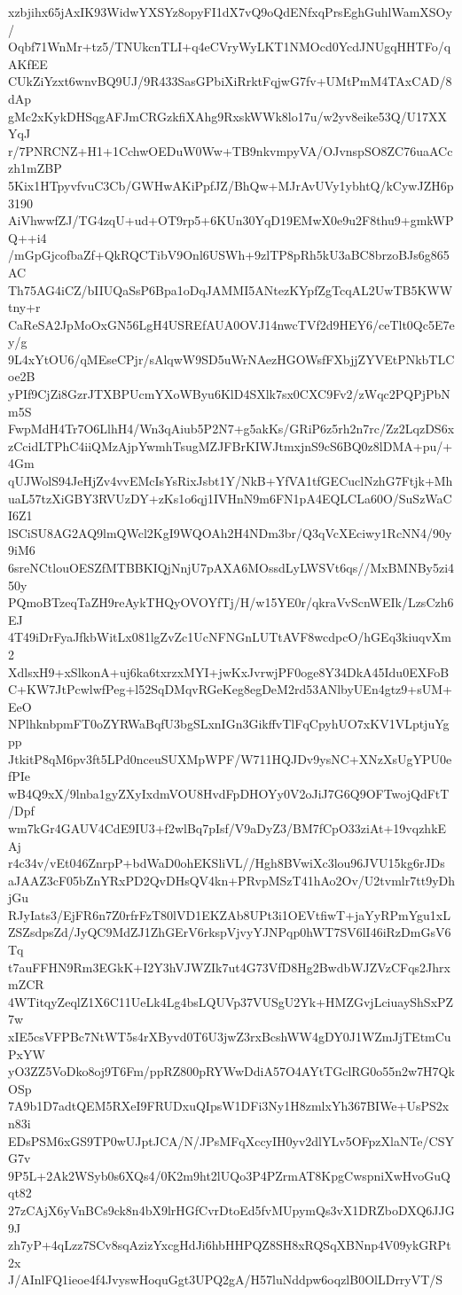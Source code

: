 xzbjihx65jAxIK93WidwYXSYz8opyFI1dX7vQ9oQdENfxqPrsEghGuhlWamXSOy/
Oqbf71WnMr+tz5/TNUkcnTLI+q4eCVryWyLKT1NMOcd0YcdJNUgqHHTFo/qAKfEE
CUkZiYzxt6wnvBQ9UJ/9R433SasGPbiXiRrktFqjwG7fv+UMtPmM4TAxCAD/8dAp
gMc2xKykDHSqgAFJmCRGzkfiXAhg9RxskWWk8lo17u/w2yv8eike53Q/U17XXYqJ
r/7PNRCNZ+H1+1CchwOEDuW0Ww+TB9nkvmpyVA/OJvnspSO8ZC76uaACczh1mZBP
5Kix1HTpyvfvuC3Cb/GWHwAKiPpfJZ/BhQw+MJrAvUVy1ybhtQ/kCywJZH6p3190
AiVhwwfZJ/TG4zqU+ud+OT9rp5+6KUn30YqD19EMwX0e9u2F8thu9+gmkWPQ++i4
/mGpGjcofbaZf+QkRQCTibV9Onl6USWh+9zlTP8pRh5kU3aBC8brzoBJs6g865AC
Th75AG4iCZ/bIIUQaSsP6Bpa1oDqJAMMI5ANtezKYpfZgTcqAL2UwTB5KWWtny+r
CaReSA2JpMoOxGN56LgH4USREfAUA0OVJ14nwcTVf2d9HEY6/ceTlt0Qc5E7ey/g
9L4xYtOU6/qMEseCPjr/sAlqwW9SD5uWrNAezHGOWsfFXbjjZYVEtPNkbTLCoe2B
yPIf9CjZi8GzrJTXBPUcmYXoWByu6KlD4SXlk7sx0CXC9Fv2/zWqc2PQPjPbNm5S
FwpMdH4Tr7O6LlhH4/Wn3qAiub5P2N7+g5akKs/GRiP6z5rh2n7rc/Zz2LqzDS6x
zCcidLTPhC4iiQMzAjpYwmhTsugMZJFBrKIWJtmxjnS9cS6BQ0z8lDMA+pu/+4Gm
qUJWolS94JeHjZv4vvEMcIsYsRixJsbt1Y/NkB+YfVA1tfGECuclNzhG7Ftjk+Mh
uaL57tzXiGBY3RVUzDY+zKs1o6qj1IVHnN9m6FN1pA4EQLCLa60O/SuSzWaCI6Z1
lSCiSU8AG2AQ9lmQWcl2KgI9WQOAh2H4NDm3br/Q3qVcXEciwy1RcNN4/90y9iM6
6sreNCtlouOESZfMTBBKIQjNnjU7pAXA6MOssdLyLWSVt6qs//MxBMNBy5zi450y
PQmoBTzeqTaZH9reAykTHQyOVOYfTj/H/w15YE0r/qkraVvScnWEIk/LzsCzh6EJ
4T49iDrFyaJfkbWitLx081lgZvZc1UcNFNGnLUTtAVF8wcdpcO/hGEq3kiuqvXm2
XdlsxH9+xSlkonA+uj6ka6txrzxMYI+jwKxJvrwjPF0oge8Y34DkA45Idu0EXFoB
C+KW7JtPcwlwfPeg+l52SqDMqvRGeKeg8egDeM2rd53ANlbyUEn4gtz9+sUM+EeO
NPlhknbpmFT0oZYRWaBqfU3bgSLxnIGn3GikffvTlFqCpyhUO7xKV1VLptjuYgpp
JtkitP8qM6pv3ft5LPd0nceuSUXMpWPF/W711HQJDv9ysNC+XNzXsUgYPU0efPIe
wB4Q9xX/9lnba1gyZXyIxdmVOU8HvdFpDHOYy0V2oJiJ7G6Q9OFTwojQdFtT/Dpf
wm7kGr4GAUV4CdE9IU3+f2wlBq7pIsf/V9aDyZ3/BM7fCpO33ziAt+19vqzhkEAj
r4c34v/vEt046ZnrpP+bdWaD0ohEKSliVL//Hgh8BVwiXc3lou96JVU15kg6rJDs
aJAAZ3cF05bZnYRxPD2QvDHsQV4kn+PRvpMSzT41hAo2Ov/U2tvmlr7tt9yDhjGu
RJyIats3/EjFR6n7Z0rfrFzT80lVD1EKZAb8UPt3i1OEVtfiwT+jaYyRPmYgu1xL
ZSZsdpsZd/JyQC9MdZJ1ZhGErV6rkspVjvyYJNPqp0hWT7SV6lI46iRzDmGsV6Tq
t7auFFHN9Rm3EGkK+I2Y3hVJWZIk7ut4G73VfD8Hg2BwdbWJZVzCFqs2JhrxmZCR
4WTitqyZeqlZ1X6C11UeLk4Lg4bsLQUVp37VUSgU2Yk+HMZGvjLciuayShSxPZ7w
xIE5csVFPBc7NtWT5s4rXByvd0T6U3jwZ3rxBcshWW4gDY0J1WZmJjTEtmCuPxYW
yO3ZZ5VoDko8oj9T6Fm/ppRZ800pRYWwDdiA57O4AYtTGclRG0o55n2w7H7QkOSp
7A9b1D7adtQEM5RXeI9FRUDxuQIpsW1DFi3Ny1H8zmlxYh367BIWe+UsPS2xn83i
EDsPSM6xGS9TP0wUJptJCA/N/JPsMFqXccyIH0yv2dlYLv5OFpzXlaNTe/CSYG7v
9P5L+2Ak2WSyb0s6XQs4/0K2m9ht2lUQo3P4PZrmAT8KpgCwspniXwHvoGuQqt82
27zCAjX6yVnBCs9ck8n4bX9lrHGfCvrDtoEd5fvMUpymQs3vX1DRZboDXQ6JJG9J
zh7yP+4qLzz7SCv8sqAzizYxcgHdJi6hbHHPQZ8SH8xRQSqXBNnp4V09ykGRPt2x
J/AInlFQ1ieoe4f4JvyswHoquGgt3UPQ2gA/H57luNddpw6oqzlB0OlLDrryVT/S
